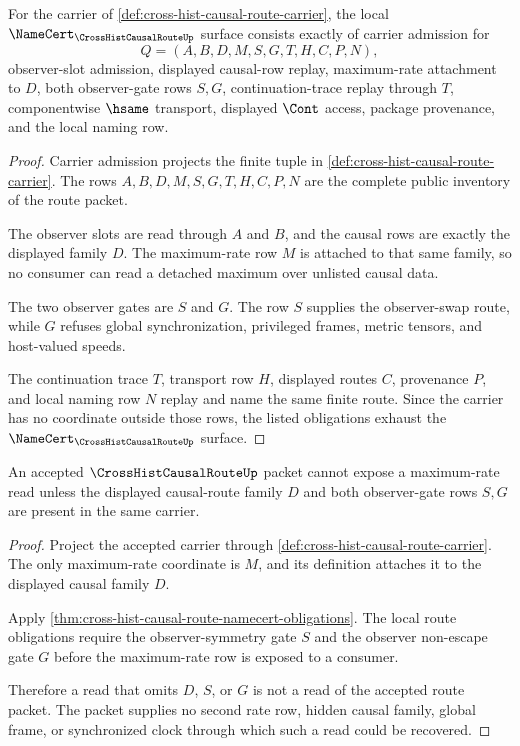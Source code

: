 \begin{theorem}
\label{thm:cross-hist-causal-route-namecert-obligations}
For the carrier of \autoref{def:cross-hist-causal-route-carrier}, the local $\NameCert_{\CrossHistCausalRouteUp}$ surface consists exactly of carrier admission for
$$
Q=(A,B,D,M,S,G,T,H,C,P,N),
$$
observer-slot admission, displayed causal-row replay, maximum-rate attachment to $D$, both observer-gate rows $S,G$, continuation-trace replay through $T$, componentwise $\hsame$ transport, displayed $\Cont$ access, package provenance, and the local naming row.
\end{theorem}
\begin{proof}
Carrier admission projects the finite tuple in \autoref{def:cross-hist-causal-route-carrier}. The rows $A,B,D,M,S,G,T,H,C,P,N$ are the complete public inventory of the route packet.

The observer slots are read through $A$ and $B$, and the causal rows are exactly the displayed family $D$. The maximum-rate row $M$ is attached to that same family, so no consumer can read a detached maximum over unlisted causal data.

The two observer gates are $S$ and $G$. The row $S$ supplies the observer-swap route, while $G$ refuses global synchronization, privileged frames, metric tensors, and host-valued speeds.

The continuation trace $T$, transport row $H$, displayed routes $C$, provenance $P$, and local naming row $N$ replay and name the same finite route. Since the carrier has no coordinate outside those rows, the listed obligations exhaust the $\NameCert_{\CrossHistCausalRouteUp}$ surface.
\end{proof}

\begin{theorem}
\label{thm:cross-hist-causal-route-maximum-rate-gate}
An accepted $\CrossHistCausalRouteUp$ packet cannot expose a maximum-rate read unless the displayed causal-route family $D$ and both observer-gate rows $S,G$ are present in the same carrier.
\end{theorem}
\begin{proof}
Project the accepted carrier through \autoref{def:cross-hist-causal-route-carrier}. The only maximum-rate coordinate is $M$, and its definition attaches it to the displayed causal family $D$.

Apply \autoref{thm:cross-hist-causal-route-namecert-obligations}. The local route obligations require the observer-symmetry gate $S$ and the observer non-escape gate $G$ before the maximum-rate row is exposed to a consumer.

Therefore a read that omits $D$, $S$, or $G$ is not a read of the accepted route packet. The packet supplies no second rate row, hidden causal family, global frame, or synchronized clock through which such a read could be recovered.
\end{proof}

